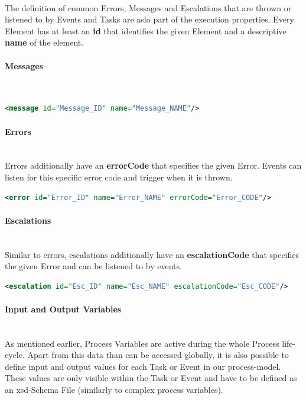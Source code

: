 ~\\The definition of common Errors, Messages and Escalations that are thrown or listened to by Events and Tasks are aslo part of the execution properties. Every Element has at least an \textbf{id} that identifies the given Element and a descriptive \textbf{name} of the element. \cite{bpmnstandard}
\paragraph{Messages}~\\
	\begin{lstlisting}[language=xml]
<message id="Message_ID" name="Message_NAME"/>
	\end{lstlisting}
\paragraph{Errors}~\\
Errors additionally have an \textbf{errorCode} that specifies the given Error. Events can listen for this specific error code and trigger when it is thrown.\\ 
	\begin{lstlisting}[language=xml]
<error id="Error_ID" name="Error_NAME" errorCode="Error_CODE"/>
	\end{lstlisting}
\paragraph{Escalations}~\\
Similar to errors, escalations additionally have an \textbf{escalationCode} that specifies the given Error and can be listened to by events. \\
	\begin{lstlisting}[language=xml]
<escalation id="Esc_ID" name="Esc_NAME" escalationCode="Esc_CODE"/>
\end{lstlisting}

\paragraph{Input and Output Variables}~\\
As mentioned earlier, Process Variables are active during the whole Process life-cycle. Apart from this data than can be accessed globally, it is also possible to define input and output values for each Task or Event in our process-model. These values are only visible within the Task or Event and have to be defined as an \gls{xsd}-Schema File (similarly to complex process variables). \cite{fundamentals}

